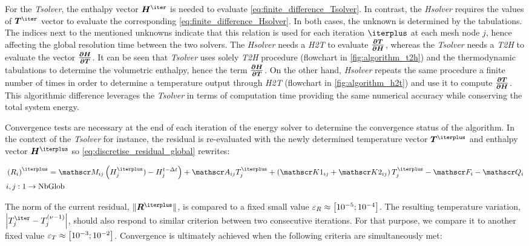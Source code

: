 For the \emph{Tsolver}, the enthalpy vector $\vec{H^\iter}$ is needed to evaluate \cref{eq:finite_difference_Tsolver}. 
In contrast, the \emph{Hsolver} requires the values of $\vec{T^\iter}$ vector to evaluate the corresponding \cref{eq:finite_difference_Hsolver}.
In both cases, the unknown is determined by the tabulations. The indices next to the mentioned unknowns
indicate that this relation is used for each iteration $\iterplus$ at each mesh node $j$, 
hence affecting the global resolution time 
between the two solvers. The \emph{Hsolver} needs a \emph{H2T} to evaluate $\vec{\dTdH}$, 
whereas the \emph{Tsolver} needs a \emph{T2H} to evaluate the vector $\vec{\dHdT}$.
It can be seen that \emph{Tsolver} uses solely \emph{T2H} procedure 
(flowchart in \cref{fig:algorithm_t2h}) and the thermodynamic tabulations to determine the volumetric enthalpy, 
hence the term $\vec{\dHdT}$. On the other hand, \emph{Hsolver} repeats the same procedure a finite number of times in order to 
determine a temperature output through \emph{H2T} (flowchart in \cref{fig:algorithm_h2t}) and use it to compute $\vec{\dTdH}$. 
This algorithmic difference leverages the 
\emph{Tsolver} in terms of computation time providing 
the same numerical accuracy while conserving the total system energy. 

Convergence tests are necessary at the end of each iteration of the energy solver to determine 
the convergence status of the algorithm. In the context of the \emph{Tsolver} for instance, the residual 
is re-evaluated with the newly determined temperature vector $\vec{T^\iterplus}$ and enthalpy vector $\vec{H^\iterplus}$ so \cref{eq:discretise_residual_global} rewrites:

\begin{align}
\begin{split}
\label{eq:discretise_residual_global_new}
& \brac{R_i}^\iterplus = \Mij \brac{\Hj^\iterplus) - \Hjtminus} + \Aij \Tj^\iterplus + \brac{\Kija + \Kijb}\Tj^\iterplus -\Fi - \Qi \\
& i,j:1 \rightarrow \text{NbGlob}
\end{split}
\end{align}

The norm of the current residual, $\norm{\vec{R^\iterplus}}$, is compared to a fixed small 
value $\varepsilon_R \approx \crochet{\num{d-5};\num{d-4}}$. The resulting temperature variation, 
$\abval{\Tj^\iter-\Tj^\iterminus}$, should also respond to similar criterion between two consecutive 
iterations. For that purpose, we compare it to another fixed value $\varepsilon_T \approx \crochet{\num{d-3};\num{d-2}}$.
Convergence is ultimately achieved when the following criteria are simultaneously met:

